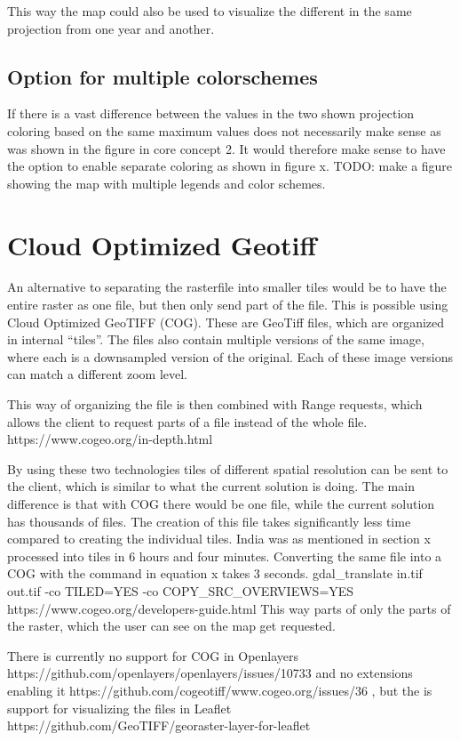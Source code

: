 This way the map could also be used to visualize the different in the same projection from one year and another.
\subsection{Option for multiple colorschemes}
If there is a vast difference between the values in the two shown projection coloring based on the same maximum values does not necessarily make sense as was shown in the figure in core concept 2. It would therefore make sense to have the option to enable separate coloring as shown in figure x. 
TODO: make a figure showing the map with multiple legends and color schemes. 


\section{Cloud Optimized Geotiff}

An alternative to separating the rasterfile into smaller tiles would be to have the entire raster as one file, but then only send part of the file. This is possible using Cloud Optimized GeoTIFF (COG). These are GeoTiff files, which are organized in internal “tiles”.
The files also contain multiple versions of the same image, where each is a downsampled version of the original. Each of these image versions can match a different zoom level.


This way of organizing the file is then combined with Range requests, which allows the client to request parts of a file instead of the whole file.
https://www.cogeo.org/in-depth.html

By using these two technologies tiles of different spatial resolution can be sent to the client, which is similar to what the current solution is doing. The main difference is that with COG there would be one file, while the current solution has thousands of files. The creation of this file takes significantly less time compared to creating the individual tiles. India was as mentioned in section x processed into tiles in 6 hours and four minutes. Converting the same file into a COG with the command in equation x takes 3 seconds.
gdal_translate in.tif out.tif -co TILED=YES -co COPY_SRC_OVERVIEWS=YES 
https://www.cogeo.org/developers-guide.html
This way parts of only the parts of the raster, which the user can see on the map get requested.


There is currently no support for COG in Openlayers
https://github.com/openlayers/openlayers/issues/10733
and no extensions enabling it
https://github.com/cogeotiff/www.cogeo.org/issues/36
, but the is support for visualizing the files in Leaflet
https://github.com/GeoTIFF/georaster-layer-for-leaflet


